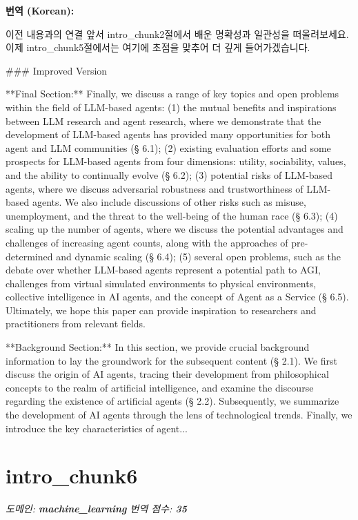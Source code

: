 \documentclass[12pt,a4paper]{article}
\begin{document}
\begin{mdframed}[style=ko]
\noindent\textbf{\small 번역 (Korean):}\\[2pt]
\begin{linkbox}{이전 내용과의 연결}
  앞서 intro_chunk2절에서 배운 명확성과 일관성을 떠올려보세요. 이제 intro_chunk5절에서는 여기에 초점을 맞추어 더 깊게 들어가겠습니다.
\end{linkbox}
### Improved Version

**Final Section:**
Finally, we discuss a range of key topics and open problems within the field of LLM-based agents: (1) the mutual benefits and inspirations between LLM research and agent research, where we demonstrate that the development of LLM-based agents has provided many opportunities for both agent and LLM communities (§ 6.1); (2) existing evaluation efforts and some prospects for LLM-based agents from four dimensions: utility, sociability, values, and the ability to continually evolve (§ 6.2); (3) potential risks of LLM-based agents, where we discuss adversarial robustness and trustworthiness of LLM-based agents. We also include discussions of other risks such as misuse, unemployment, and the threat to the well-being of the human race (§ 6.3); (4) scaling up the number of agents, where we discuss the potential advantages and challenges of increasing agent counts, along with the approaches of pre-determined and dynamic scaling (§ 6.4); (5) several open problems, such as the debate over whether LLM-based agents represent a potential path to AGI, challenges from virtual simulated environments to physical environments, collective intelligence in AI agents, and the concept of Agent as a Service (§ 6.5). Ultimately, we hope this paper can provide inspiration to researchers and practitioners from relevant fields.

**Background Section:**
In this section, we provide crucial background information to lay the groundwork for the subsequent content (§ 2.1). We first discuss the origin of AI agents, tracing their development from philosophical concepts to the realm of artificial intelligence, and examine the discourse regarding the existence of artificial agents (§ 2.2). Subsequently, we summarize the development of AI agents through the lens of technological trends. Finally, we introduce the key characteristics of agent...
\end{mdframed}
\vspace{1em}

\section{intro\_chunk6}
\noindent\textit{\small 도메인: \textbf{machine\_learning} \quad 번역 점수: \textbf{\color{red!70!black}35}}
\vspace{0.5em}
\end{document}
